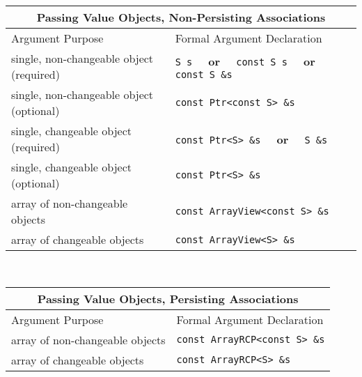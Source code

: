 \begin{tabular}{|l|l|}
%
\multicolumn{2}{c}{\textbf{Passing Value Objects, Non-Persisting Associations}} \\
%
\hline
Argument Purpose
& Formal Argument Declaration \\
\hline
\hline
single, non-changeable object (required)
& {}\texttt{S s} $\;\;\;\;$\textbf{or}$\;\;\;\;$ {}\texttt{const S s} $\;\;\;\;$\textbf{or}$\;\;\;\;$ {}\texttt{const S \&s} \\
\hline
single, non-changeable object (optional)
& {}\texttt{const Ptr<const S> \&s} \\
\hline
single, changeable object (required)
& {}\texttt{const Ptr<S> \&s}  $\;\;\;\;$\textbf{or}$\;\;\;\;$ {}\texttt{S \&s} \\
\hline
single, changeable object (optional)
& \texttt{const Ptr<S> \&s} \\
\hline
array of non-changeable objects
& {}\texttt{const ArrayView<const S> \&s} \\
\hline
array of changeable objects
& {}\texttt{const ArrayView<S> \&s} \\
\hline
%
\end{tabular} \\[3ex]
%
\begin{tabular}{|l|l|}
%
\multicolumn{2}{c}{\textbf{Passing Value Objects, Persisting Associations}} \\
%
\hline
Argument Purpose
& Formal Argument Declaration \\
\hline
\hline
array of non-changeable objects
& {}\texttt{const ArrayRCP<const S> \&s} \\
\hline
array of changeable objects
& {}\texttt{const ArrayRCP<S> \&s} \\
\hline
\end{tabular}
